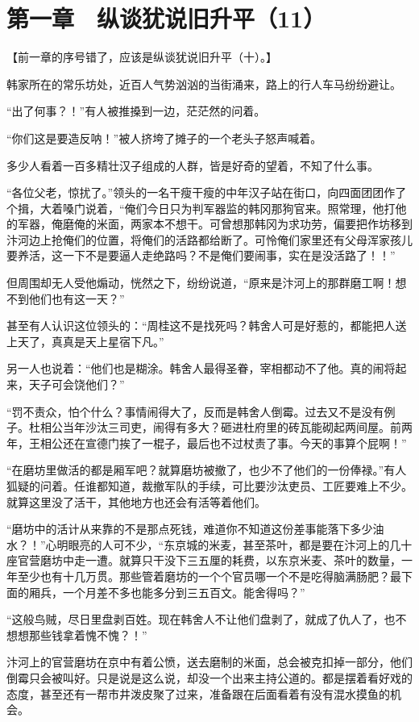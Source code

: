 \section{第一章　纵谈犹说旧升平（11）}

【前一章的序号错了，应该是纵谈犹说旧升平（十）。】

韩家所在的常乐坊处，近百人气势汹汹的当街涌来，路上的行人车马纷纷避让。

“出了何事？！”有人被推搡到一边，茫茫然的问着。

“你们这是要造反呐！”被人挤垮了摊子的一个老头子怒声喊着。

多少人看着一百多精壮汉子组成的人群，皆是好奇的望着，不知了什么事。

“各位父老，惊扰了。”领头的一名干瘦干瘦的中年汉子站在街口，向四面团团作了个揖，大着嗓门说着，“俺们今日只为判军器监的韩冈那狗官来。照常理，他打他的军器，俺磨俺的米面，两家本不想干。可曾想那韩冈为求功劳，偏要把作坊移到汴河边上抢俺们的位置，将俺们的活路都给断了。可怜俺们家里还有父母浑家孩儿要养活，这一下不是要逼人走绝路吗？不是俺们要闹事，实在是没活路了！！”

但周围却无人受他煽动，恍然之下，纷纷说道，“原来是汴河上的那群磨工啊！想不到他们也有这一天？”

甚至有人认识这位领头的：“周桂这不是找死吗？韩舍人可是好惹的，都能把人送上天了，真真是天上星宿下凡。”

另一人也说着：“他们也是糊涂。韩舍人最得圣眷，宰相都动不了他。真的闹将起来，天子可会饶他们？”

“罚不责众，怕个什么？事情闹得大了，反而是韩舍人倒霉。过去又不是没有例子。杜相公当年沙汰三司吏，闹得有多大？砸进杜府里的砖瓦能砌起两间屋。前两年，王相公还在宣德门挨了一棍子，最后也不过杖责了事。今天的事算个屁啊！”

“在磨坊里做活的都是厢军吧？就算磨坊被撤了，也少不了他们的一份俸禄。”有人狐疑的问着。任谁都知道，裁撤军队的手续，可比要沙汰吏员、工匠要难上不少。就算这里没了活干，其他地方也还会有活等着他们。

“磨坊中的活计从来靠的不是那点死钱，难道你不知道这份差事能落下多少油水？！”心明眼亮的人可不少，“东京城的米麦，甚至茶叶，都是要在汴河上的几十座官营磨坊中走一遭。就算只干没下三五厘的耗费，以东京米麦、茶叶的数量，一年至少也有十几万贯。那些管着磨坊的一个个官员哪一个不是吃得脑满肠肥？最下面的厢兵，一个月差不多也能多分到三五百文。能舍得吗？”

“这般鸟贼，尽日里盘剥百姓。现在韩舍人不让他们盘剥了，就成了仇人了，也不想想那些钱拿着愧不愧？！”

汴河上的官营磨坊在京中有着公愤，送去磨制的米面，总会被克扣掉一部分，他们倒霉只会被叫好。只是说是这么说，却没一个出来主持公道的。都是摆着看好戏的态度，甚至还有一帮市井泼皮聚了过来，准备跟在后面看着有没有混水摸鱼的机会。


